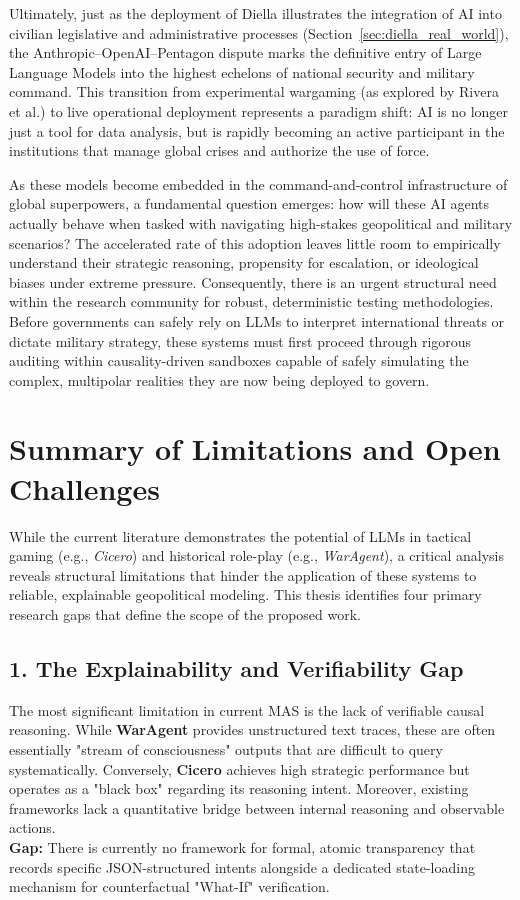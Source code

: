 Ultimately, just as the deployment of Diella illustrates the integration of AI into civilian legislative and administrative processes (Section~\ref{sec:diella_real_world}), the Anthropic--OpenAI--Pentagon dispute marks the definitive entry of Large Language Models into the highest echelons of national security and military command. This transition from experimental wargaming (as explored by Rivera et al.) to live operational deployment represents a paradigm shift: AI is no longer just a tool for data analysis, but is rapidly becoming an active participant in the institutions that manage global crises and authorize the use of force.

As these models become embedded in the command-and-control infrastructure of global superpowers, a fundamental question emerges: how will these AI agents actually behave when tasked with navigating high-stakes geopolitical and military scenarios? The accelerated rate of this adoption leaves little room to empirically understand their strategic reasoning, propensity for escalation, or ideological biases under extreme pressure. Consequently, there is an urgent structural need within the research community for robust, deterministic testing methodologies. Before governments can safely rely on LLMs to interpret international threats or dictate military strategy, these systems must first proceed through rigorous auditing within causality-driven sandboxes capable of safely simulating the complex, multipolar realities they are now being deployed to govern.



\section{Summary of Limitations and Open Challenges}
\label{sec:soa_limitations}

While the current literature demonstrates the potential of LLMs in tactical gaming (e.g., \textit{Cicero}) and historical role-play (e.g., \textit{WarAgent}), a critical analysis reveals structural limitations that hinder the application of these systems to reliable, explainable geopolitical modeling. This thesis identifies four primary research gaps that define the scope of the proposed work.

\subsection*{1. The Explainability and Verifiability Gap}
The most significant limitation in current MAS is the lack of verifiable causal reasoning. While \textbf{WarAgent} provides unstructured text traces, these are often essentially "stream of consciousness" outputs that are difficult to query systematically.
Conversely, \textbf{Cicero} achieves high strategic performance but operates as a "black box" regarding its reasoning intent. Moreover, existing frameworks lack a quantitative bridge between internal reasoning and observable actions.
\\
\textbf{Gap:} There is currently no framework for formal, atomic transparency that records specific JSON-structured intents alongside a dedicated state-loading mechanism for counterfactual "What-If" verification.

